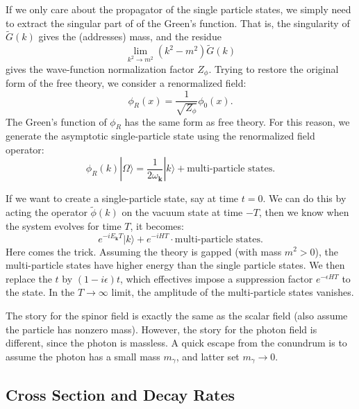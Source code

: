 If we only care about the propagator of the single particle states, we simply need to extract the singular part of of the Green's function.
That is, the singularity of $\tilde{G}(k)$ gives the (addresses) mass, and the residue 
\begin{equation*}
	\lim_{k^2 \rightarrow m^2} (k^2-m^2)\tilde{G}(k)
\end{equation*}
gives the wave-function normalization factor $Z_\phi$.
Trying to restore the original form of the free theory, we consider a renormalized field:
\begin{equation}
	\phi_R(x) = \frac{1}{\sqrt{Z_\phi}}\phi_0(x).
\end{equation}
The Green's function of $\phi_R$ has the same form as free theory.
For this reason, we generate the asymptotic single-particle state using the renormalized field operator:
\begin{equation}\label{eq:scalar-field-generate-particle}
	\phi_R(k)|\Omega\rangle = \frac{1}{2\omega_{\bm k}}|k\rangle + \text{multi-particle states}.
\end{equation}

If we want to create a single-particle state, say at time $t=0$.
We can do this by acting the operator $\tilde{\phi}(k)$ on the vacuum state at time $-T$, then we know when the system evolves for time $T$, it becomes:
\begin{equation}
	e^{-i E_{\bm k} T}|k\rangle + e^{-iHT} \cdot \text{multi-particle states}.
\end{equation}
Here comes the trick.
Assuming the theory is gapped (with mass $m^2>0$), the multi-particle states have higher energy than the single particle states.
We then replace the $t$ by $(1-i\epsilon)t$, which effectives impose a suppression factor $e^{-\epsilon H T}$ to the state.
In the $T\rightarrow \infty$ limit, the amplitude of the multi-particle states vanishes.

The story for the spinor field is exactly the same as the scalar field (also assume the particle has nonzero mass).
However, the story for the photon field is different, since the photon is massless.
A quick escape from the conundrum is to assume the photon has a small mass $m_\gamma$, and latter set $m_\gamma \rightarrow 0$.



\subsection{Cross Section and Decay Rates}

